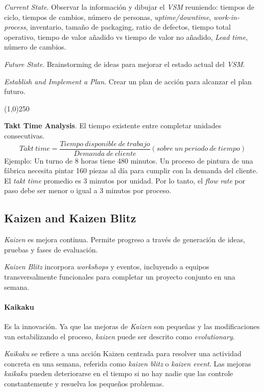 \documentclass[]{article}
\begin{document}
\textit{Current State}. Observar la información y dibujar el \textit{VSM} reuniendo: tiempos de ciclo, tiempos de cambios, número de personas, \textit{uptime/downtime}, \textit{work-in-process}, inventario, tamaño de packaging, ratio de defectos, tiempo total operativo, tiempo de valor añadido vs tiempo de valor no añadido, \textit{Lead time}, número de cambios.

\textit{Future State}. Brainstorming de ideas para mejorar el estado actual del \textit{VSM}.

\textit{Establish and Implement a Plan}. Crear un plan de acción para alcanzar el plan futuro.
\begin{center}
	\line(1,0){250}
\end{center}

\textbf{Takt Time Analysis}. El tiempo existente entre completar unidades consecutivas.
\begin{equation}
Takt \ time = \frac{Tiempo \ disponible \ de \ trabajo}{Demanda \ de \ cliente} (sobre \ un \ periodo \ de \ tiempo)
\end{equation}
Ejemplo: Un turno de 8 horas tiene 480 minutos. Un proceso de pintura de una fábrica necesita pintar 160 piezas al día para cumplir con la demanda del cliente. El \textit{takt time} promedio es 3 minutos por unidad. Por lo tanto, el \textit{flow rate} por paso debe ser menor o igual a 3 minutos por proceso.

\subsection{Kaizen and Kaizen Blitz}

\textit{Kaizen} es mejora continua. Permite progreso a través de generación de ideas, pruebas y fases de evaluación. 

\textit{Kaizen Blitz} incorpora \textit{workshops} y eventos, incluyendo a equipos transversalmente funcionales para completar un proyecto conjunto en una semana.

\paragraph{Kaikaku}

Es la innovación. Ya que las mejoras de \textit{Kaizen} son pequeñas y las modificaciones van estabilizando el proceso, \textit{kaizen} puede ser descrito como \textit{evolutionary}. 

\textit{Kaikaku} se refiere a una acción Kaizen centrada para resolver una actividad concreta en una semana, referida como \textit{kaizen blitz} o \textit{kaizen event}. Las mejoras \textit{kaikaku} pueden deteriorarse en el tiempo si no hay nadie que las controle constantemente y resuelva los pequeños problemas.
\end{document}
